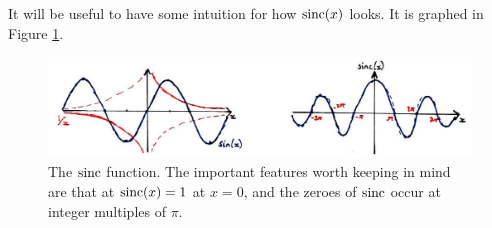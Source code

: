 %
It will be useful to have some intuition for how $\operatorname{sinc}(x)$ looks. It is
graphed in Figure \ref{fig::lecture_4_sinc}.
%
\begin{figure}[!htb]
  \includegraphics[width=\textwidth]{images/lecture_4_sinc.JPG}
  \caption{
    The $\operatorname{sinc}$ function. The important features worth keeping in mind are
    that at $\operatorname{sinc}(x) = 1$ at $x=0$, and the zeroes of $\operatorname{sinc}$ occur at
    integer multiples of $\pi$.
  }
  \label{fig::lecture_4_sinc}
\end{figure}

